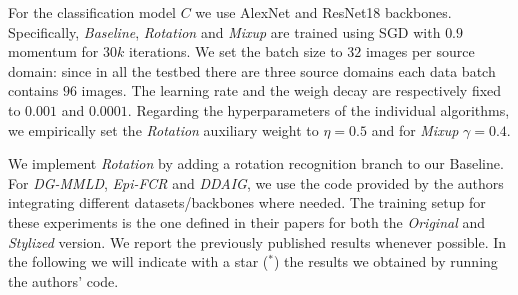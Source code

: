 For the classification model $C$ we use AlexNet and ResNet18 backbones. Specifically, \emph{Baseline}, \emph{Rotation} and \emph{Mixup} are trained using SGD with $0.9$ momentum for $30k$ iterations. We set the batch size to $32$ images per source domain: since in all the testbed there are three source domains each data batch contains $96$ images. The learning rate and the weigh decay are respectively fixed to $0.001$ and $0.0001$. Regarding the hyperparameters of the individual algorithms, we empirically set the \emph{Rotation} auxiliary weight to $\eta = 0.5$ and for \emph{Mixup} $\gamma= 0.4$.

We implement \emph{Rotation} by adding a rotation recognition branch to our Baseline.
For \emph{DG-MMLD}, \emph{Epi-FCR} and \emph{DDAIG}, we use the code provided by the authors integrating different datasets/backbones where needed. The training setup for these experiments is the one defined in their papers for both the \emph{Original} and \emph{Stylized} version. 
We report the previously published results whenever possible. In the following we will indicate with a star ($^*$) the results we obtained by running the authors' code.

